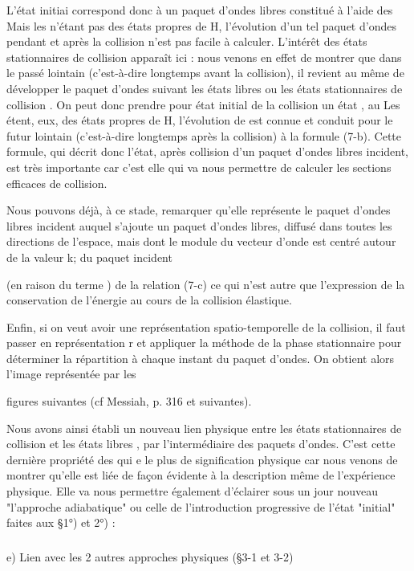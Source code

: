 L'état initiai correspond donc à un paquet d'ondes libres
 constitué à l'aide des  Mais les  n'étant pas des
états propres de H, l'évolution d'un tel paquet d'ondes pendant et après
la collision n'est pas facile à calculer. L'intérêt des états stationnaires de
collision apparaît ici : nous venons en effet de montrer que dans
le passé lointain (c'est-à-dire longtemps avant la collision), il revient
au même de développer le paquet d'ondes suivant les états libres  ou
les états stationnaires de collision  . On peut donc prendre pour
état initial de la collision un état  , au  Les
 étent, eux, des états propres de H, l'évolution de  est
connue et conduit pour le futur lointain (c'est-à-dire longtemps après la
collision) à la formule (7-b). Cette formule, qui décrit donc l'état,
après collision d'un paquet d'ondes libres incident, est très importante
car c'est elle qui va nous permettre de calculer les sections efficaces
de collision.

Nous pouvons déjà, à ce stade, remarquer qu'elle représente le
paquet d'ondes libres incident auquel s'ajoute un paquet d'ondes libres,
diffusé dans toutes les directions de l'espace, mais dont le module du
vecteur d'onde est centré autour de la valeur k; du paquet incident


(en raison du terme ) de la relation (7-c) ce qui n'est autre
que l'expression de la conservation de l'énergie au cours de la collision élastique.

Enfin, si on veut avoir une représentation spatio-temporelle
de la collision, il faut passer en représentation r et appliquer la méthode de la
phase stationnaire pour déterminer la répartition à chaque
instant du paquet d'ondes. On obtient alors l'image représentée par les

figures suivantes (cf Messiah, p. 316 et suivantes).


Nous avons ainsi établi un nouveau lien physique entre les
états stationnaires de collision  et les états libres  , par
l'intermédiaire des paquets d'ondes. C'est cette dernière propriété des
 qui e le plus de signification physique car nous venons de montrer
qu'elle est liée de façon évidente à la description même de l'expérience
physique. Elle va nous permettre également d'éclairer sous un jour nouveau
"l'approche adiabatique" ou celle de l'introduction progressive de l'état
"initial" faites aux \S 1°) et 2°) :

\subsubsection{}%
e) Lien avec les 2 autres approches physiques (\S 3-1 et 3-2)

